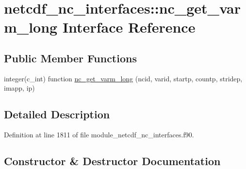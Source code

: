 \hypertarget{interfacenetcdf__nc__interfaces_1_1nc__get__varm__long}{}\section{netcdf\+\_\+nc\+\_\+interfaces\+:\+:nc\+\_\+get\+\_\+varm\+\_\+long Interface Reference}
\label{interfacenetcdf__nc__interfaces_1_1nc__get__varm__long}
\subsection*{Public Member Functions}
\begin{DoxyCompactItemize}
\item 
integer(c\+\_\+int) function \hyperlink{interfacenetcdf__nc__interfaces_1_1nc__get__varm__long_aee8cf3ced07a3bfd3875bcd7a258da29}{nc\+\_\+get\+\_\+varm\+\_\+long} (ncid, varid, startp, countp, stridep, imapp, ip)
\end{DoxyCompactItemize}


\subsection{Detailed Description}


Definition at line 1811 of file module\+\_\+netcdf\+\_\+nc\+\_\+interfaces.\+f90.



\subsection{Constructor \& Destructor Documentation}
\mbox{\label{interfacenetcdf__nc__interfaces_1_1nc__get__varm__long_aee8cf3ced07a3bfd3875bcd7a258da29}} 
